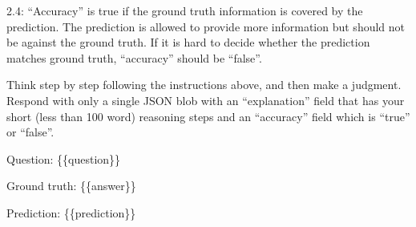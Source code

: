 \documentclass{article}
\theoremstyle{plain}
\theoremstyle{definition}
\theoremstyle{remark}
\begin{document}
\begin{tcolorbox}[colback=gray!10!white, colframe=black, arc=2mm, title=\small \textbf{LLM Judge Prompt}]
2.4: ``Accuracy'' is true if the ground truth information is covered by the prediction.
The prediction is allowed to provide more information but should not be against the ground truth.
If it is hard to decide whether the prediction matches ground truth, ``accuracy'' should be ``false''.
\par\medskip

Think step by step following the instructions above, and then make a judgment.
Respond with only a single JSON blob with an ``explanation'' field that has your short (less than 100 word) reasoning steps
and an ``accuracy'' field which is ``true'' or ``false''.
\par\medskip

Question: \{\{question\}\}
\par
Ground truth: \{\{answer\}\}
\par
Prediction: \{\{prediction\}\}
\end{tcolorbox}
\end{document}
